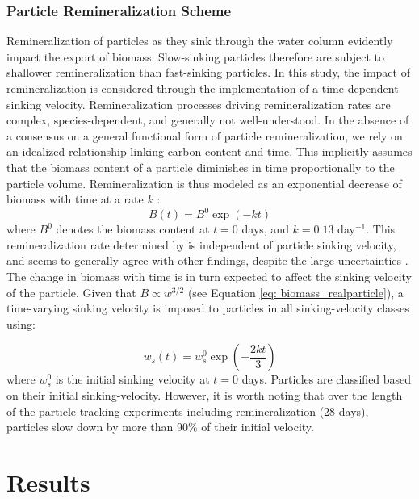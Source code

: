 \documentclass[draft,linenumbers]{agujournal2018}
\begin{document}
\subsubsection{Particle Remineralization Scheme}
\label{sec: remin_scheme}
Remineralization of particles as they sink through the water column evidently impact the export of biomass. Slow-sinking particles therefore are subject to shallower remineralization than fast-sinking particles. In this study, the impact of remineralization is considered through the implementation of a time-dependent sinking velocity. Remineralization processes driving remineralization rates are complex, species-dependent, and generally not well-understood. In the absence of a consensus on a general functional form of particle remineralization, we rely on an idealized relationship linking carbon content and time. This implicitly assumes that the biomass content of a particle diminishes in time proportionally to the particle volume. Remineralization is thus modeled as an exponential decrease of biomass with time at a rate $k$ \citep{Iversen_2010, Iversen_2013}:
\begin{equation}
	B (t) = B^0\exp(-kt)
	\label{eq: remin_scheme}
\end{equation}
where $B^0$ denotes the biomass content at $t = 0$ days, and $k = 0.13$ day$^{-1}$. This remineralization rate determined by \cite{Iversen_2010} is independent of particle sinking velocity, and seems to generally agree with other findings, despite the large uncertainties \citep{Ploug_2008, Iversen_2013}. The change in biomass with time is in turn expected to affect the sinking velocity of the particle. Given that $B \propto w^{3/2}$ (see Equation \ref{eq: biomass_realparticle}),  a time-varying sinking velocity is imposed to particles in all sinking-velocity classes using:

\begin{equation}
w_s (t) = w_s^0\exp(-\frac{2kt}{3})
\label{eq: sinking_velocity_remin}
\end{equation}
where $w_s^0$ is the initial sinking velocity at $t = 0$ days. Particles are classified based on their initial sinking-velocity. However, it is worth noting that over the length of the particle-tracking experiments including remineralization (28 days), particles slow down by more than 90\% of their initial velocity.

\section{Results}
\label{sec: Results}
\end{document}
